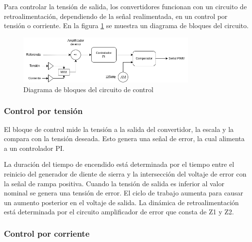 Para controlar la tensión de salida, los convertidores funcionan con un circuito de retroalimentación,
dependiendo de la señal realimentada, en un control por tensión o corriente. En la figura \ref{fig:marco_teorico:control} se muestra un diagrama de bloques del circuito.

\begin{figure}[ht]
    \centering
    \includegraphics[width=0.8\textwidth]{images/compensador.png}
    \caption{Diagrama de bloques del circuito de control}
    \label{fig:marco_teorico:control}
\end{figure}

\subsubsection{Control por tensión}

El bloque de control mide la tensión a la salida del convertidor, la escala y la compara con la tensión deseada.
Esto genera una señal de error, la cual alimenta a un controlador PI.

La duración del tiempo de encendido está determinada por el tiempo entre el reinicio del generador de diente de sierra
y la intersección del voltaje de error con la señal de rampa positiva. 
Cuando la tensión de salida es inferior al valor nominal se genera una tensión de error. 
El ciclo de trabajo aumenta para causar un aumento posterior en el voltaje de salida. 
La dinámica de retroalimentación está determinada por el circuito amplificador de error que consta de Z1 y Z2.

\subsubsection{Control por corriente}

